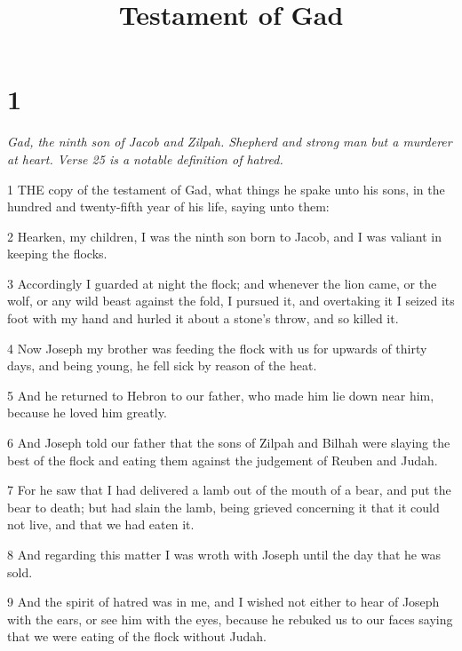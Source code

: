 

\title{Testament of Gad}

\chapter{1}

\par \textit{Gad, the ninth son of Jacob and Zilpah. Shepherd and strong man but a murderer at heart. Verse 25 is a notable definition of hatred.}

\par 1 THE copy of the testament of Gad, what things he spake unto his sons, in the hundred and twenty-fifth year of his life, saying unto them:

\par 2 Hearken, my children, I was the ninth son born to Jacob, and I was valiant in keeping the flocks.

\par 3 Accordingly I guarded at night the flock; and whenever the lion came, or the wolf, or any wild beast against the fold, I pursued it, and overtaking it I seized its foot with my hand and hurled it about a stone's throw, and so killed it.

\par 4 Now Joseph my brother was feeding the flock with us for upwards of thirty days, and being young, he fell sick by reason of the heat.

\par 5 And he returned to Hebron to our father, who made him lie down near him, because he loved him greatly.

\par 6 And Joseph told our father that the sons of Zilpah and Bilhah were slaying the best of the flock and eating them against the judgement of Reuben and Judah.

\par 7 For he saw that I had delivered a lamb out of the mouth of a bear, and put the bear to death; but had slain the lamb, being grieved concerning it that it could not live, and that we had eaten it.

\par 8 And regarding this matter I was wroth with Joseph until the day that he was sold.

\par 9 And the spirit of hatred was in me, and I wished not either to hear of Joseph with the ears, or see him with the eyes, because he rebuked us to our faces saying that we were eating of the flock without Judah.

